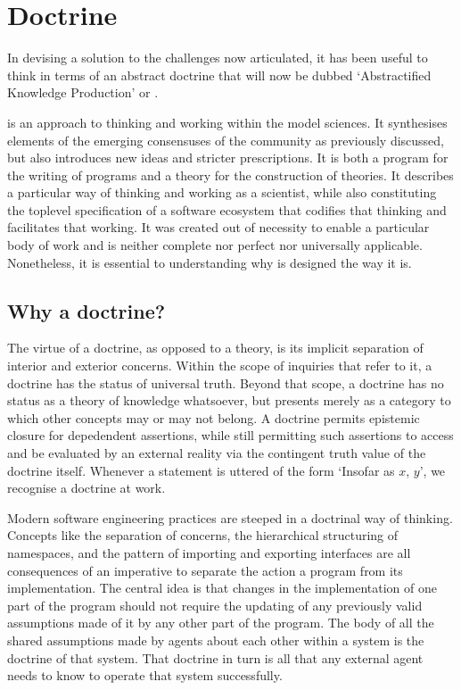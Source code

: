 \documentclass[letterpaper,10pt,english]{jupyterBook}
\begin{document}
\section{Doctrine}
\label{\detokenize{content/chapter_03_everest/doctrine:doctrine}}\label{\detokenize{content/chapter_03_everest/doctrine::doc}}
\sphinxAtStartPar
In devising a solution to the challenges now articulated, it has been useful to think in terms of an abstract doctrine that will now be dubbed ‘Abstractified Knowledge Production’ or .

\sphinxAtStartPar
{} is an approach to thinking and working within the model sciences. It synthesises elements of the emerging consensuses of the community as previously discussed, but also introduces new ideas and stricter prescriptions. It is both a program for the writing of programs and a theory for the construction of theories. It describes a particular way of thinking and working as a scientist, while also constituting the top\sphinxhyphen{}level specification of a software ecosystem that codifies that thinking and facilitates that working. It was created out of necessity to enable a particular body of work and is neither complete nor perfect nor universally applicable. Nonetheless, it is essential to understanding why  is designed the way it is.


\subsection{Why a doctrine?}
\label{\detokenize{content/chapter_03_everest/doctrine:why-a-doctrine}}
\sphinxAtStartPar
The virtue of a doctrine, as opposed to a theory, is its implicit separation of interior and exterior concerns. Within the scope of inquiries that refer to it, a doctrine has the status of universal truth. Beyond that scope, a doctrine has no status as a theory of knowledge whatsoever, but presents merely as a category to which other concepts may or may not belong. A doctrine permits epistemic closure for depedendent assertions, while still permitting such assertions to access and be evaluated by an external reality via the contingent truth value of the doctrine itself. Whenever a statement is uttered of the form ‘Insofar as \(x\), \(y\)’, we recognise a doctrine at work.

\sphinxAtStartPar
Modern software engineering practices are steeped in a doctrinal way of thinking. Concepts like the separation of concerns, the hierarchical structuring of namespaces, and the pattern of importing and exporting interfaces are all consequences of an imperative to separate the action a program from its implementation. The central idea is that changes in the implementation of one part of the program should not require the updating of any previously valid assumptions made of it by any other part of the program. The body of all the shared assumptions made by agents about each other within a system is the doctrine of that system. That doctrine in turn is all that any external agent needs to know to operate that system successfully.
\end{document}
